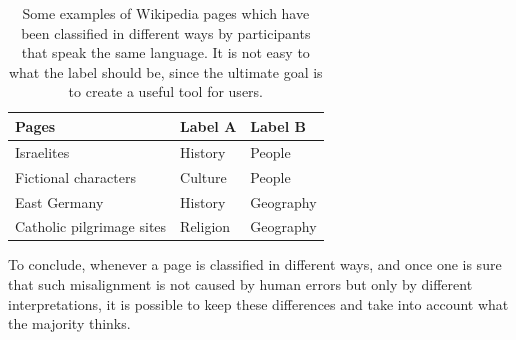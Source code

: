         \begin{table}
            \centering
            \begin{tabular}{|l|l|l|}
                \hline
                Pages                     & Label A                         & Label B              \\ \hline \hline
                Israelites                & History & People \\ \hline
                Fictional characters      & Culture & People      \\ \hline
                East Germany              & History            & Geography \\ \hline
                Catholic pilgrimage sites & Religion    & Geography \\ \hline
            \end{tabular}
            \caption{Some examples of Wikipedia pages which have been classified in different ways by participants that speak the same language. It is not easy to what the  label should be, since the ultimate goal is to create a useful tool for users.}
            \label{uncertainty}
        \end{table}
        
        To conclude, whenever a page is classified in different ways, and once one is sure that such misalignment is not caused by human errors but only by different interpretations, it is possible to keep these differences and take into account what the majority thinks.